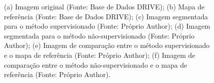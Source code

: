 \begin{figure}[H]
    \caption{(a) Imagem original (Fonte: Base de Dados DRIVE); (b) Mapa de refer\^{e}ncia (Fonte: Base de Dados DRIVE); (c) Imagem segmentada para o m\'{e}todo supervisionado (Fonte: Pr\'{o}prio Author); (d) Imagem segmentada para o m\'{e}todo n\~{a}o-supervisionado (Fonte: Pr\'{o}prio Author); (e) Imagem de compara\c{c}\~{a}o entre o m\'{e}todo supervisionado e o mapa de refer\^{e}ncia (Fonte: Pr\'{o}prio Author); (f) Imagem de compara\c{c}\~{a}o entre o m\'{e}todo n\~{a}o-supervisionado e o mapa de refer\^{e}ncia (Fonte: Pr\'{o}prio Author).}
    \label{Fig:exemplesDrive}
\end{figure}

